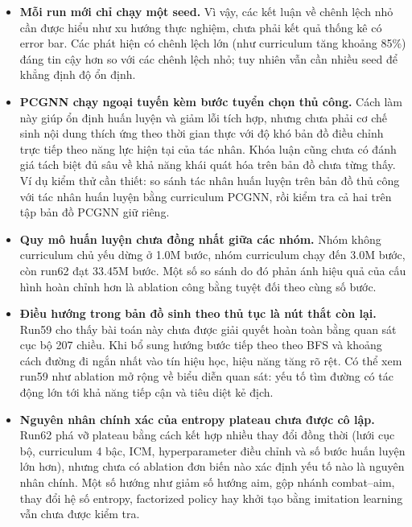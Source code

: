 \begin{itemize}
    \item \textbf{Mỗi run mới chỉ chạy một seed.} Vì vậy, các kết luận về chênh lệch nhỏ cần được hiểu như xu hướng thực nghiệm, chưa phải kết quả thống kê có error bar. Các phát hiện có chênh lệch lớn (như curriculum tăng khoảng 85\%) đáng tin cậy hơn so với các chênh lệch nhỏ; tuy nhiên vẫn cần nhiều seed để khẳng định độ ổn định.

    \item \textbf{PCGNN chạy ngoại tuyến kèm bước tuyển chọn thủ công.} Cách làm này giúp ổn định huấn luyện và giảm lỗi tích hợp, nhưng chưa phải cơ chế sinh nội dung thích ứng theo thời gian thực với độ khó bản đồ điều chỉnh trực tiếp theo năng lực hiện tại của tác nhân. Khóa luận cũng chưa có đánh giá tách biệt đủ sâu về khả năng khái quát hóa trên bản đồ chưa từng thấy. Ví dụ kiểm thử cần thiết: so sánh tác nhân huấn luyện trên bản đồ thủ công với tác nhân huấn luyện bằng curriculum PCGNN, rồi kiểm tra cả hai trên tập bản đồ PCGNN giữ riêng.

    \item \textbf{Quy mô huấn luyện chưa đồng nhất giữa các nhóm.} Nhóm không curriculum chủ yếu dừng ở 1.0M bước, nhóm curriculum chạy đến 3.0M bước, còn run62 đạt 33.45M bước. Một số so sánh do đó phản ánh hiệu quả của cấu hình hoàn chỉnh hơn là ablation công bằng tuyệt đối theo cùng số bước.

    \item \textbf{Điều hướng trong bản đồ sinh theo thủ tục là nút thắt còn lại.} Run59 cho thấy bài toán này chưa được giải quyết hoàn toàn bằng quan sát cục bộ 207 chiều. Khi bổ sung hướng bước tiếp theo theo BFS và khoảng cách đường đi ngắn nhất vào tín hiệu học, hiệu năng tăng rõ rệt. Có thể xem run59 như ablation mở rộng về biểu diễn quan sát: yếu tố tìm đường có tác động lớn tới khả năng tiếp cận và tiêu diệt kẻ địch.

    \item \textbf{Nguyên nhân chính xác của entropy plateau chưa được cô lập.} Run62 phá vỡ plateau bằng cách kết hợp nhiều thay đổi đồng thời (lưới cục bộ, curriculum 4 bậc, ICM, hyperparameter điều chỉnh và số bước huấn luyện lớn hơn), nhưng chưa có ablation đơn biến nào xác định yếu tố nào là nguyên nhân chính. Một số hướng như giảm số hướng aim, gộp nhánh combat--aim, thay đổi hệ số entropy, factorized policy hay khởi tạo bằng imitation learning vẫn chưa được kiểm tra.
\end{itemize}


